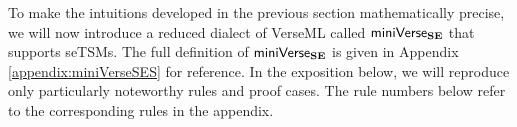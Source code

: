

To make the intuitions developed in the previous section mathematically precise, we will now introduce a reduced dialect of VerseML called $\mathsf{miniVerse}_\textbf{SE}$ that supports seTSMs. 
The full definition of $\mathsf{miniVerse}_\textbf{SE}$ is given in Appendix \ref{appendix:miniVerseSES} for reference. In the exposition below, we will reproduce only particularly noteworthy rules and proof cases. The rule numbers below refer to the corresponding rules in the appendix.

